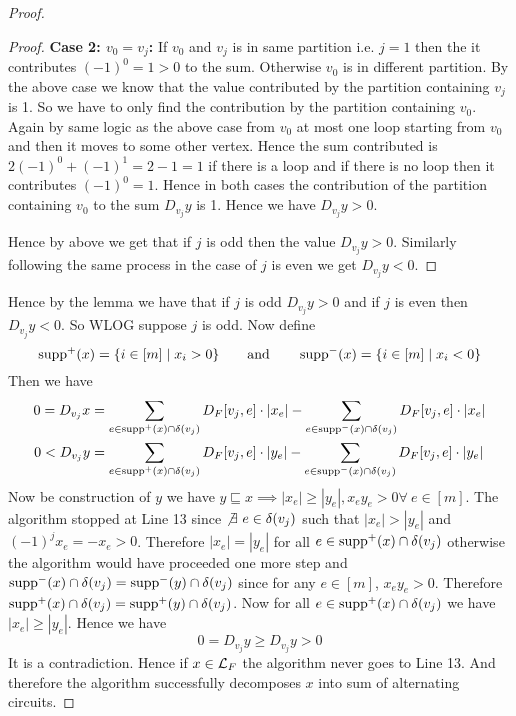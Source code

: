 \begin{proof}
\begin{proof}
		\textbf{Case 2: $v_0=v_j$:} If $v_0$ and $v_j$ is in same partition i.e. $j=1$ then the it contributes $(-1)^0=1>0$ to the sum. Otherwise $v_0$ is in different partition. By the above case we know that the value contributed by the partition containing $v_j$ is 1. So we have to only find the contribution by the partition containing $v_0$. Again by same logic as the above case from $v_0$ at most one loop starting from $v_0$ and then it moves to some other vertex. Hence the sum contributed is $2(-1)^0+(-1)^1=2-1=1$ if there is a loop and if there is no loop then it contributes $(-1)^0=1$. Hence in both cases the contribution of the partition containing $v_0$ to the sum $D_{v_j}y$ is 1. Hence we have $D_{v_j}y>0$.\parinn

		Hence by above we get that if $j$ is odd then the value $D_{v_j}y>0$. Similarly following the same process in the case of $j$ is even we get $D_{v_j}y<0$.\end{proof}

	\vspace*{5mm}

	Hence by the lemma we have that if $j$ is odd $D_{v_j}y>0$ and if $j$ is even then $D_{v_j}y<0$. So WLOG suppose $j$ is odd. Now define $$\operatorname{supp}^+(x)=\{i\in [m]\mid x_i>0\}\qquad \text{and}\qquad \operatorname{supp}^-(x)=\{i\in[m]\mid x_i<0\}$$Then we have \begin{align*}
		0=D_{v_j}x & = \sum_{e\in \operatorname{supp}^+(x)\cap \delta(v_j)} D_F[v_j,e]\cdot |x_e| -\sum_{e\in \operatorname{supp}^-(x)\cap \delta(v_j)}D_F[v_j,e]\cdot|x_e| \\
		0<D_{v_j}y & = \sum_{e\in \operatorname{supp}^+(x)\cap \delta(v_j)} D_F[v_j,e]\cdot |y_e| -\sum_{e\in \operatorname{supp}^-(x)\cap \delta(v_j)}D_F[v_j,e]\cdot|y_e|
	\end{align*}
	Now be construction of $y$ we have $y\sqsubseteq x\implies |x_e|\geq |y_e|, x_ey_e>0\forall\ e\in[m]$. The algorithm stopped at Line 13 since $\not\exists\ e\in \delta(v_j)$ such that $|x_e|>|y_e|$ and $(-1)^jx_e=-x_e>0$. Therefore $|x_e|=|y_e| $ for all $e\in \operatorname{supp}^+(x)\cap \delta(v_j)$ otherwise the algorithm would have proceeded one more step and $\operatorname{supp}^-(x)\cap\delta(v_j)=\operatorname{supp}^-(y)\cap \delta(v_j)$ since for any $e\in[m]$, $x_ey_e>0$. Therefore $\operatorname{supp}^+(x)\cap \delta(v_j)=\operatorname{supp}^+(y)\cap \delta(v_j)$. Now for all $e\in \operatorname{supp}^+(x)\cap \delta(v_j)$ we have $|x_e|\geq |y_e|$. Hence we have $$0=D_{v_j}y\geq D_{v_j}y>0$$It is a contradiction. Hence if $x\in \mathcal{L}_F$ the algorithm never goes to Line 13. And therefore the algorithm successfully decomposes $x$ into sum of alternating circuits.
\end{proof}

